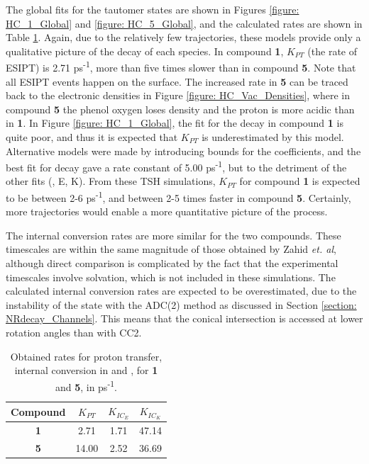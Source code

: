 The global fits for the tautomer states are shown in Figures \ref{figure: HC_1_Global} and \ref{figure: HC_5_Global}, and the calculated rates are shown in Table \ref{table: species_decay_rates}. Again, due to the relatively few trajectories, these models provide only a qualitative picture of the decay of each species.
In compound \textbf{1}, $K_{PT}$ (the rate of ESIPT) is 2.71 ps\textsuperscript{-1},  more than five times slower than in compound \textbf{5}. Note that all ESIPT events happen on the \sone{} surface. The increased rate in \textbf{5} can be traced back to the electronic densities in Figure \ref{figure: HC_Vac_Densities}, where in compound \textbf{5} the phenol oxygen loses density and the proton is more acidic than in \textbf{1}. In Figure \ref{figure: HC_1_Global}, the fit for the \Kstar{} decay in compound \textbf{1} is quite poor, and thus it is expected that $K_{PT}$ is underestimated by this model. Alternative models were made by introducing bounds for the coefficients, and the best fit for \Kstar{} decay gave a rate constant of 5.00 ps\textsuperscript{-1}, but to the detriment of the other fits (\Estar{}, E, K). From these \ac{TSH} simulations, $K_{PT}$ for compound \textbf{1} is expected to be between 2-6 ps\textsuperscript{-1}, and between 2-5 times faster in compound \textbf{5}. Certainly, more trajectories would enable a more quantitative picture of the process.

The internal conversion rates are more similar for the two compounds. These timescales are within the same magnitude of those obtained by Zahid \textit{et. al}, although direct comparison is complicated by the fact that the experimental timescales involve solvation, which is not included in these simulations.\cite{Zahid2017} The calculated internal conversion rates are expected to be overestimated, due to the instability of the \szero{} state with the ADC(2) method as discussed in Section \ref{section: NRdecay_Channels}. This means that the conical intersection is accessed at lower rotation angles than with CC2.  

\begin{table}[t]
\centering
\caption[Obtained rates for tautomer decay processes for compounds \textbf{1} and \textbf{5}]{Obtained rates for proton transfer, internal conversion in \Estar{} and \Kstar{}, for \textbf{1} and \textbf{5}, in ps\textsuperscript{-1}.}
\begin{tabular}{cccc}
    \hline
     Compound & $K_{PT}$ & $K_{IC_{E}}$ & $K_{IC_{K}}$ \\
     \hline
     \textbf{1} & 2.71 & 1.71 & 47.14 \\
     \textbf{5} & 14.00 & 2.52 & 36.69 \\
     \hline
\end{tabular}
\label{table: species_decay_rates}
\end{table}

